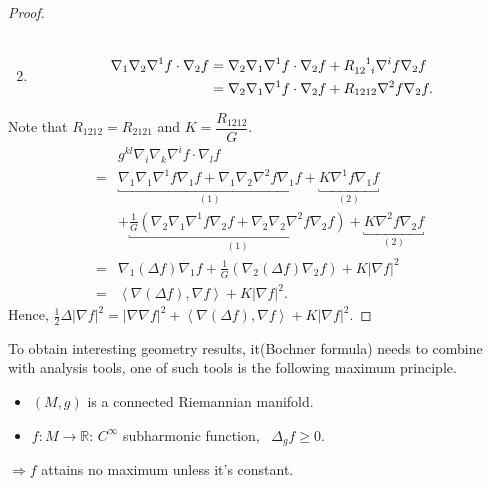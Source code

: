 \begin{proof}
\begin{enumerate}[(1)]
\begin{align*}
        \end{align*}
        \item \begin{align*}
            \nabla_1 \nabla_2 \nabla^1 f\cdot \nabla_2 f
            &=\nabla_2 \nabla_1 \nabla^1 f\cdot \nabla_2 f+ 
            \tensor{R}{_{12}^1_i}\nabla^i f \nabla_2 f\\
            &=\nabla_2\nabla_1 \nabla^1 f\cdot \nabla_2 f
            +R_{1212}\nabla^2 f\nabla_2 f.
        \end{align*}
    \end{enumerate}
    Note that \(R_{1212}=R_{2121}\) and \(K=\dfrac{R_{1212}}{G}\).
        \begin{align*}
            & g^{kl}\nabla_i\nabla_k\nabla^i f
            \cdot \nabla_l f\\
            =&\underbracket{\nabla_1\nabla_1\nabla^1 f
            \nabla_1 f+ \nabla_1\nabla_2\nabla^2 f \nabla_1 f 
            }_{(1)}+\underbracket{K\nabla^1 f\nabla_1 f}_{(2)}\\
            &
            +\underbracket{\frac{1}{G}\left(
                \nabla_2\nabla_1\nabla^1 f \nabla_2 f
                +\nabla_2\nabla_2\nabla^2 f \nabla_2 f
            \right)}_{(1)}+\underbracket{K\nabla^2 f\nabla_2 f}_{(2)}\\
            =&\nabla_1\left(\Delta f\right)\nabla_1 f
            +\frac{1}{G}\left(\nabla_2(\Delta f)\nabla_2 f\right)
            + K|\nabla f|^2\\
            =&\left\langle\nabla(\Delta f),\nabla f\right\rangle
            +K |\nabla f|^2.
        \end{align*}
        Hence, \(
            \frac{1}{2}\Delta |\nabla f|^2 =|\nabla\nabla f|^2+\left\langle
                \nabla\left(\Delta f\right),\nabla f\right\rangle 
                +K|\nabla f|^2    
        \).
\end{proof}
To obtain interesting geometry results, it(Bochner formula) needs to combine with
analysis tools, one of such tools is the following maximum principle.
\begin{theorem}
    \hfill
    \begin{itemize}
        \item \((M,g)\) is a connected Riemannian manifold.
        \item \(f\colon M\to \mathbb{R}\): \(C^\infty\) subharmonic function,
        \ie\ \(\Delta_g f\ge 0\).
    \end{itemize}
    \(\Rightarrow\)\(f\) attains no maximum unless it's constant.
\end{theorem}

